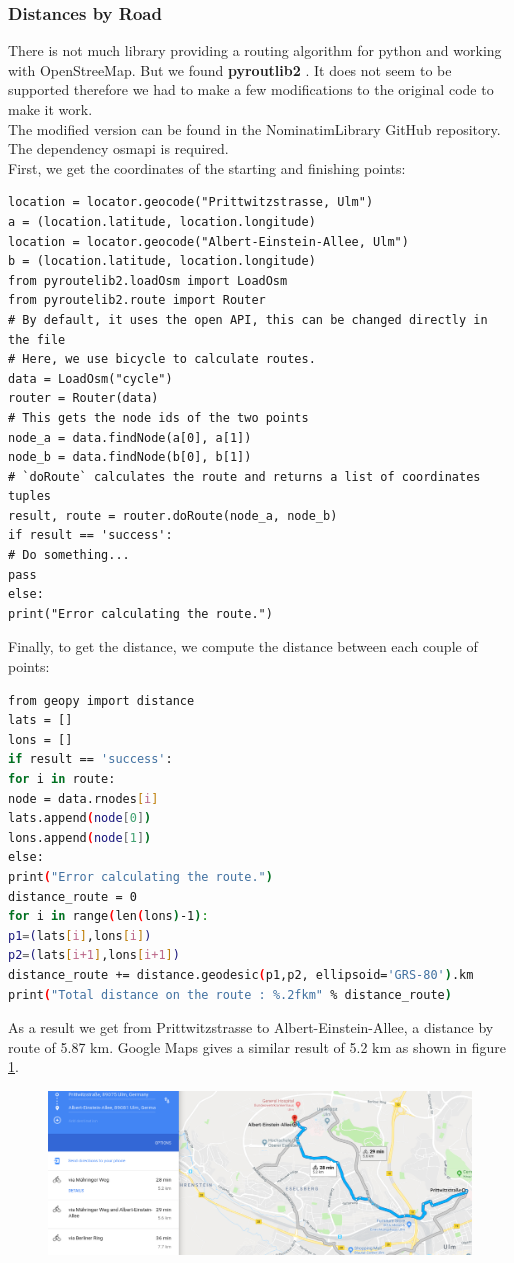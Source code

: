 \subsubsection{Distances by Road}
There is not much library providing a routing algorithm for python and working with OpenStreeMap.
But we found \textbf{pyroutlib2} \citep{OpenStreetMap2017}. It does not seem to be supported therefore we
had to make a few modifications to the original code to make it work.\\
The modified version can be found in the NominatimLibrary GitHub repository.\\
The dependency osmapi is required.\\
First, we get the coordinates of the starting and finishing points:
\begin{lstlisting}[breaklines=true]
location = locator.geocode("Prittwitzstrasse, Ulm")
a = (location.latitude, location.longitude)
location = locator.geocode("Albert-Einstein-Allee, Ulm")
b = (location.latitude, location.longitude)
from pyroutelib2.loadOsm import LoadOsm
from pyroutelib2.route import Router
# By default, it uses the open API, this can be changed directly in the file
# Here, we use bicycle to calculate routes.
data = LoadOsm("cycle")
router = Router(data)
# This gets the node ids of the two points
node_a = data.findNode(a[0], a[1])
node_b = data.findNode(b[0], b[1])
# `doRoute` calculates the route and returns a list of coordinates tuples
result, route = router.doRoute(node_a, node_b)
if result == 'success':
# Do something...
pass
else:
print("Error calculating the route.")
\end{lstlisting}
Finally, to get the distance, we compute the distance between each couple of points:
\begin{lstlisting}[language=bash,breaklines=true]
from geopy import distance
lats = []
lons = []
if result == 'success':
for i in route:
node = data.rnodes[i]
lats.append(node[0])
lons.append(node[1])
else:
print("Error calculating the route.")
distance_route = 0
for i in range(len(lons)-1):
p1=(lats[i],lons[i])
p2=(lats[i+1],lons[i+1])
distance_route += distance.geodesic(p1,p2, ellipsoid='GRS-80').km
print("Total distance on the route : %.2fkm" % distance_route)
\end{lstlisting}
As a result we get from Prittwitzstrasse to Albert-Einstein-Allee, a distance by route of 5.87 km. 
Google Maps gives a similar result of 5.2 km as shown in figure \ref{fig:route}.
\begin{figure}[H]
\hspace{-1.3cm}
\includegraphics[width=1.3\textwidth]{img/route}
\label{fig:route}
\end{figure}
